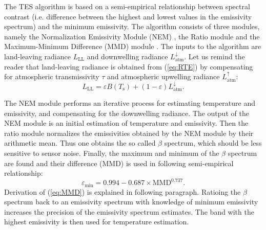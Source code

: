 The TES algorithm is based on a semi-empirical relationship between spectral contrast (i.e. difference between the highest and lowest values in the emissivity spectrum) and the minimum emissivity. The algorithm consists of three modules, namely the Normalization Emissivity Module (NEM) \cite{G86}, the Ratio module and the Maximum-Minimum Difference (MMD) module \cite{M94}. The inputs to the algorithm are land-leaving radiance $L_\mathrm{LL}$ and downwelling radiance $L^{\downarrow}_\mathrm{atm}$. Let us remind the reader that land-leaving radiance is obtained from (\ref{eq:RTE}) by compensating for atmospheric transmissivity $\tau$ and atmospheric upwelling radiance $L^{\uparrow}_\mathrm{atm}$:
\begin{equation}
\label{eq:landleavingRadiance}
L_\mathrm{LL} = \varepsilon B(T_\mathrm{s}) + (1 - \varepsilon) L^\downarrow_\mathrm{atm}.
\end{equation}

The NEM module performs an iterative process for estimating temperature and emissivity, and compensating for the downwelling radiance. The output of the NEM module is an initial estimation of temperature and emissivity. Then the ratio module normalizes the emissivities obtained by the NEM module by their arithmetic mean. Thus one obtains the so called $\beta$ spectrum, which should be less sensitive to sensor noise. Finally, the maximum and minimum of the $\beta$ spectrum are found and their difference (MMD) is used in following semi-empirical relationship:
\begin{equation} 
\label{eq:MMD}
\varepsilon_\mathrm{min} = 0.994 - 0.687 \times \mathrm{MMD}^{0.737}. 
\end{equation}
Derivation of (\ref{eq:MMD}) is explained in following paragraph. Ratioing the $\beta$ spectrum back to an emissivity spectrum with knowledge of minimum emissivity increases the precision of the emissivity spectrum estimates. The band with the highest emissivity is then used for temperature estimation.

